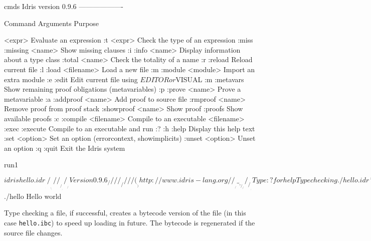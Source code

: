 \begin{SaveVerbatim}{cmds}
Idris version 0.9.6
-------------------

   Command         Arguments   Purpose
                               
   <expr>                      Evaluate an expression
   :t              <expr>      Check the type of an expression
   :miss :missing  <name>      Show missing clauses
   :i :info        <name>      Display information about a type class
   :total          <name>      Check the totality of a name
   :r :reload                  Reload current file
   :l :load        <filename>  Load a new file
   :m :module      <module>    Import an extra module
   :e :edit                    Edit current file using $EDITOR or $VISUAL
   :m :metavars                Show remaining proof obligations (metavariables)
   :p :prove       <name>      Prove a metavariable
   :a :addproof    <name>      Add proof to source file
   :rmproof        <name>      Remove proof from proof stack
   :showproof      <name>      Show proof
   :proofs                     Show available proofs
   :c :compile     <filename>  Compile to an executable <filename>
   :exec :execute              Compile to an executable and run
   :? :h :help                 Display this help text
   :set            <option>    Set an option (errorcontext, showimplicits)
   :unset          <option>    Unset an option
   :q :quit                    Exit the Idris system
\end{SaveVerbatim}


\begin{SaveVerbatim}{run1}

$ idris hello.idr
     ____    __     _                                          
    /  _/___/ /____(_)____                                     
    / // __  / ___/ / ___/     Version 0.9.6
  _/ // /_/ / /  / (__  )      http://www.idris-lang.org/      
 /___/\__,_/_/  /_/____/       Type :? for help        

Type checking ./hello.idr
*hello> :t main 
main : IO ()
*hello> :c hello 
*hello> :q 
Bye bye
$ ./hello 
Hello world

\end{SaveVerbatim}


\noindent
Type checking a file, if successful, creates a bytecode version of the file (in
this case \texttt{hello.ibc}) to speed up loading in future. The bytecode is
regenerated if the source file changes.

